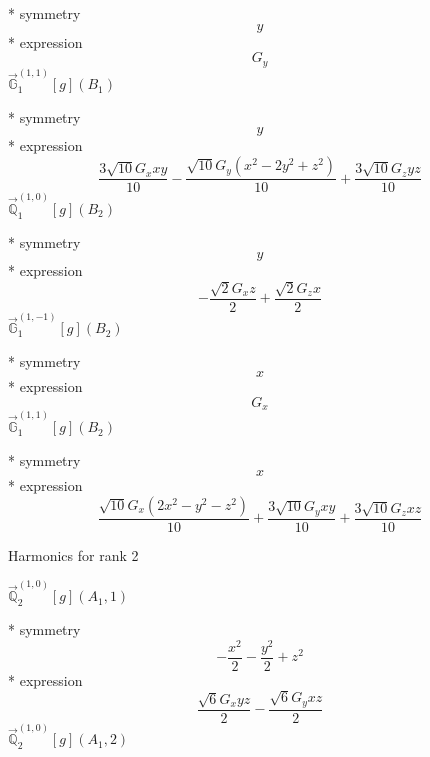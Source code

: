 \documentclass[fleqn,8pt]{jsarticle}
\begin{document}
\noindent\quad ** symmetry
\begin{dmath*}
y
\end{dmath*}
\noindent\quad ** expression
\begin{dmath*}
G_{y}
\end{dmath*}
\noindent\quad $\vec{\mathbb{G}}_{1}^{(1,1)}[g](B_{1})$

\noindent\quad ** symmetry
\begin{dmath*}
y
\end{dmath*}
\noindent\quad ** expression
\begin{dmath*}
\frac{3 \sqrt{10} G_{x} x y}{10} - \frac{\sqrt{10} G_{y} \left(x^{2} - 2 y^{2} + z^{2}\right)}{10} + \frac{3 \sqrt{10} G_{z} y z}{10}
\end{dmath*}
\noindent\quad $\vec{\mathbb{Q}}_{1}^{(1,0)}[g](B_{2})$

\noindent\quad ** symmetry
\begin{dmath*}
y
\end{dmath*}
\noindent\quad ** expression
\begin{dmath*}
- \frac{\sqrt{2} G_{x} z}{2} + \frac{\sqrt{2} G_{z} x}{2}
\end{dmath*}
\noindent\quad $\vec{\mathbb{G}}_{1}^{(1,-1)}[g](B_{2})$

\noindent\quad ** symmetry
\begin{dmath*}
x
\end{dmath*}
\noindent\quad ** expression
\begin{dmath*}
G_{x}
\end{dmath*}
\noindent\quad $\vec{\mathbb{G}}_{1}^{(1,1)}[g](B_{2})$

\noindent\quad ** symmetry
\begin{dmath*}
x
\end{dmath*}
\noindent\quad ** expression
\begin{dmath*}
\frac{\sqrt{10} G_{x} \left(2 x^{2} - y^{2} - z^{2}\right)}{10} + \frac{3 \sqrt{10} G_{y} x y}{10} + \frac{3 \sqrt{10} G_{z} x z}{10}
\end{dmath*}

\noindent * Harmonics for rank 2

\noindent\quad $\vec{\mathbb{Q}}_{2}^{(1,0)}[g](A_{1},1)$

\noindent\quad ** symmetry
\begin{dmath*}
- \frac{x^{2}}{2} - \frac{y^{2}}{2} + z^{2}
\end{dmath*}
\noindent\quad ** expression
\begin{dmath*}
\frac{\sqrt{6} G_{x} y z}{2} - \frac{\sqrt{6} G_{y} x z}{2}
\end{dmath*}
\noindent\quad $\vec{\mathbb{Q}}_{2}^{(1,0)}[g](A_{1},2)$
\end{document}
